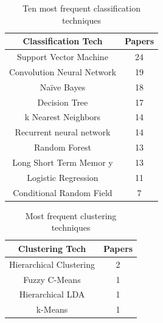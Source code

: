 \begin{table}[H]
\centering
\caption{Ten most frequent classification techniques}
\label{tab:rsl_freq_classification}
\begin{tabular}{@{}cc@{}}
\toprule
\textbf{Classification Tech} & \textbf{Papers} \\ \midrule
Support Vector Machine       & 24              \\
Convolution Neural Network   & 19              \\
Naïve Bayes                  & 18              \\
Decision Tree                & 17              \\
k Nearest Neighbors          & 14              \\
Recurrent neural network     & 14              \\
Random Forest                & 13              \\
Long Short Term Memor y      & 13              \\
Logistic Regression          & 11              \\
Conditional Random Field     & 7               \\ \bottomrule
\end{tabular}
\end{table}


\begin{table}[H]
\centering
\caption{Most frequent clustering techniques}
\label{tab:rsl_freq_clustering}
\begin{tabular}{cc}
\hline
\textbf{Clustering Tech} & \textbf{Papers} \\ \hline
Hierarchical Clustering  & 2               \\
Fuzzy C-Means            & 1               \\
Hierarchical LDA         & 1               \\
k-Means                  & 1              
\end{tabular}
\end{table}

